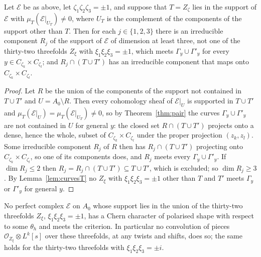 \begin{proposition}\label{prop:rest}
Let $\mathcal{E}$ be as above, let $\zeta_{1}\zeta_{2}\zeta_{3}=\pm1$, and suppose that $T=Z_{\zeta}$ lies in the support of $\mathcal{E}$ with $\mu_{T}(\mathcal{E}|_{U_{T}})\ne0$, where $U_{T}$ is the complement of the components of the support other than $T$. Then for each $j\in\{1,2,3\}$ there is an irreducible component $R_{j}$ of the support of $\mathcal{E}$ of dimension at least three, not one of the thirty-two threefolds $Z_{\xi}$ with $\xi_{1}\xi_{2}\xi_{3}=\pm1$, which meets $\Gamma_{y}\cup\Gamma'_{y}$ for every $y\in C_{\zeta_{k}}\times C_{\zeta_{l}}$; and $R_{j}\cap(T\cup T')$ has an irreducible component that maps onto $C_{\zeta_{k}}\times C_{\zeta_{l}}$.
\end{proposition}

\begin{proof}
Let $R$ be the union of the components of the support not contained in $T\cup T'$ and $U=A_{0}\setminus R$. Then every cohomology sheaf of $\mathcal{E}|_{U}$ is supported in $T\cup T'$ and $\mu_{T}(\mathcal{E}|_{U})=\mu_{T}(\mathcal{E}|_{U_{T}})\ne0$, so by Theorem~\ref{thm:pair} the curves $\Gamma_{y}\cup\Gamma'_{y}$ are not contained in $U$ for general $y$: the closed set $R\cap(T\cup T')$ projects onto a dense, hence the whole, subset of $C_{\zeta_{k}}\times C_{\zeta_{l}}$ under the proper projection $(z_{k},z_{l})$. Some irreducible component $R_{j}$ of $R$ then has $R_{j}\cap(T\cup T')$ projecting onto $C_{\zeta_{k}}\times C_{\zeta_{l}}$, so one of its components does, and $R_{j}$ meets every $\Gamma_{y}\cup\Gamma'_{y}$. If $\dim R_{j}\le2$ then $R_{j}=R_{j}\cap(T\cup T')\subseteq T\cup T'$, which is excluded; so $\dim R_{j}\ge3$. By Lemma~\ref{lem:curvesT} no $Z_{\xi}$ with $\xi_{1}\xi_{2}\xi_{3}=\pm1$ other than $T$ and $T'$ meets $\Gamma_{y}$ or $\Gamma'_{y}$ for general $y$.
\end{proof}

\begin{corollary}\label{cor:threefolds}
No perfect complex $\mathcal{E}$ on $A_{0}$ whose support lies in the union of the thirty-two threefolds $Z_{\xi}$, $\xi_{1}\xi_{2}\xi_{3}=\pm1$, has a Chern character of polarised shape with respect to some $\theta_{h}$ and meets the criterion. In particular no convolution of pieces $\mathcal{O}_{Z_{\xi}}\otimes L^{k}[s]$ over these threefolds, at any twists and shifts, does so; the same holds for the thirty-two threefolds with $\xi_{1}\xi_{2}\xi_{3}=\pm i$.
\end{corollary}

